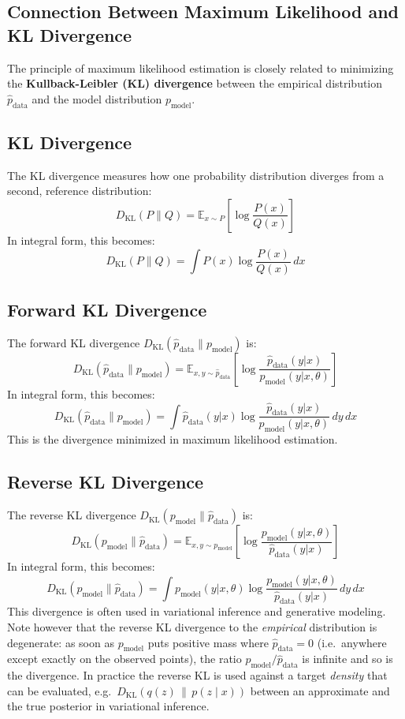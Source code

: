 \begin{notechapter}
\section{Connection Between Maximum Likelihood and KL Divergence}
The principle of maximum likelihood estimation is closely related to minimizing the \textbf{Kullback-Leibler (KL) divergence} between the empirical distribution \( \hat{p}_{\text{data}} \) and the model distribution \( p_{\text{model}} \).

\subsection{KL Divergence}
The KL divergence measures how one probability distribution diverges from a second, reference distribution:
\[
D_{\text{KL}}(P \| Q) = \mathbb{E}_{x \sim P} \left[ \log \frac{P(x)}{Q(x)} \right]
\]
In integral form, this becomes:
\[
D_{\text{KL}}(P \| Q) = \int P(x) \log \frac{P(x)}{Q(x)} \, dx
\]

\subsection{Forward KL Divergence}
The forward KL divergence \( D_{\text{KL}}(\hat{p}_{\text{data}} \| p_{\text{model}}) \) is:
\[
D_{\text{KL}}(\hat{p}_{\text{data}} \| p_{\text{model}}) = \mathbb{E}_{x,y \sim \hat{p}_{\text{data}}} \left[ \log \frac{\hat{p}_{\text{data}}(y | x)}{p_{\text{model}}(y | x, \theta)} \right]
\]
In integral form, this becomes:
\[
D_{\text{KL}}(\hat{p}_{\text{data}} \| p_{\text{model}}) = \int \hat{p}_{\text{data}}(y | x) \log \frac{\hat{p}_{\text{data}}(y | x)}{p_{\text{model}}(y | x, \theta)} \, dy \, dx
\]
This is the divergence minimized in maximum likelihood estimation.

\subsection{Reverse KL Divergence}
The reverse KL divergence \( D_{\text{KL}}(p_{\text{model}} \| \hat{p}_{\text{data}}) \) is:
\[
D_{\text{KL}}(p_{\text{model}} \| \hat{p}_{\text{data}}) = \mathbb{E}_{x,y \sim p_{\text{model}}} \left[ \log \frac{p_{\text{model}}(y | x, \theta)}{\hat{p}_{\text{data}}(y | x)} \right]
\]
In integral form, this becomes:
\[
D_{\text{KL}}(p_{\text{model}} \| \hat{p}_{\text{data}}) = \int p_{\text{model}}(y | x, \theta) \log \frac{p_{\text{model}}(y | x, \theta)}{\hat{p}_{\text{data}}(y | x)} \, dy \, dx
\]
This divergence is often used in variational inference and generative modeling.
Note however that the reverse KL divergence to the \emph{empirical} distribution is degenerate: as soon as \( p_{\text{model}} \) puts positive mass where \( \hat{p}_{\text{data}} = 0 \) (i.e.\ anywhere except exactly on the observed points), the ratio \( p_{\text{model}}/\hat{p}_{\text{data}} \) is infinite and so is the divergence. In practice the reverse KL is used against a target \emph{density} that can be evaluated, e.g.\ \( D_{\text{KL}}(q(z) \,\|\, p(z \mid x)) \) between an approximate and the true posterior in variational inference.\\


\end{notechapter}
